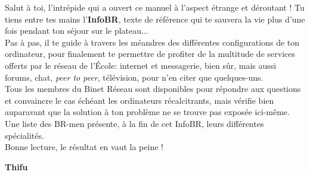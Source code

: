 \indent 
Salut \`a toi, l'intr\'epide qui a ouvert ce manuel \`a l'aspect \'etrange et d\'eroutant ! Tu tiens entre tes mains l'\textbf{InfoBR}, texte de r\'ef\'erence qui te sauvera la vie plus d'une fois pendant ton s\'ejour sur le plateau...\\

Pas \`a pas, il te guide \`a travers les m\'eandres des diff\'erentes configurations de ton ordinateur, pour finalement te permettre de profiter de la multitude de services offerts par le r\'eseau de l'\'Ecole: internet et messagerie, bien s\^{u}r, mais aussi forums, chat, \emph{peer to peer}, t\'el\'evision, pour n'en citer que quelques-uns.\\

Tous les membres du Binet R\'eseau sont disponibles pour r\'epondre aux questions et convaincre le cas \'ech\'eant les ordinateurs r\'ecalcitrants, mais v\'erifie bien auparavant que la solution \`a ton probl\`eme ne se trouve pas expos\'ee ici-m\^{e}me. Une liste des \mbox{BR-men} pr\'esente, \`a la fin de cet InfoBR, leurs diff\'erentes sp\'ecialit\'es.\\

Bonne lecture, le r\'esultat en vaut la peine !\\

\begin{flushright}
\textbf{Thifu}
\end{flushright}
 